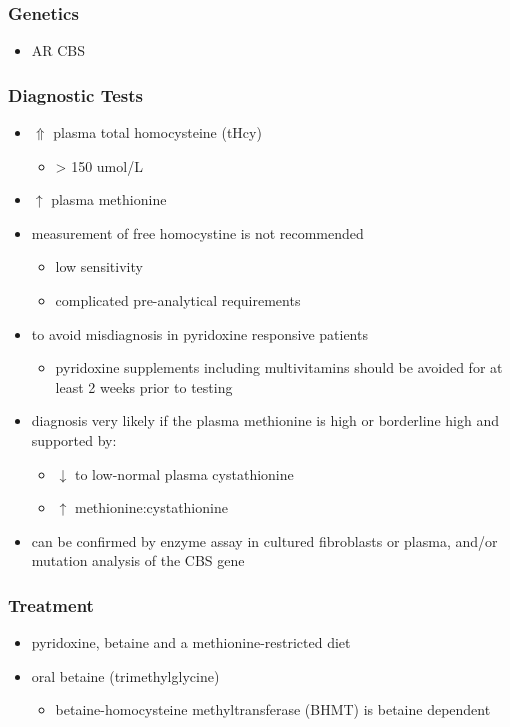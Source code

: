\documentclass[12pt]{scrartcl}
\begin{document}
\begin{center}
\begin{center}
\subsubsection{Genetics}
\label{sec:orgdc1993c}
\begin{itemize}
\item AR CBS
\end{itemize}

\subsubsection{Diagnostic Tests}
\label{sec:org0719aaa}
\begin{itemize}
\item \(\Uparrow\) plasma total homocysteine (tHcy)
\begin{itemize}
\item \textgreater{} 150 umol/L
\end{itemize}
\item \(\uparrow\) plasma methionine
\item measurement of free homocystine is not recommended
\begin{itemize}
\item low sensitivity
\item complicated pre-analytical requirements
\end{itemize}
\item to avoid misdiagnosis in pyridoxine responsive patients
\begin{itemize}
\item pyridoxine supplements including multivitamins should be avoided
for at least 2 weeks prior to testing
\end{itemize}
\item diagnosis very likely if the plasma methionine is high or borderline
high and supported by:
\begin{itemize}
\item \(\downarrow\) to low-normal plasma cystathionine
\item \(\uparrow\) methionine:cystathionine
\end{itemize}
\item can be confirmed by enzyme assay in cultured fibroblasts or plasma,
and/or mutation analysis of the CBS gene
\end{itemize}

\subsubsection{Treatment}
\label{sec:orgeef42cc}
\begin{itemize}
\item pyridoxine, betaine and a methionine-restricted diet
\item oral betaine (trimethylglycine)
\begin{itemize}
\item betaine-homocysteine methyltransferase (BHMT) is betaine dependent
\end{itemize}
\end{itemize}


\end{center}
\end{center}
\end{document}
